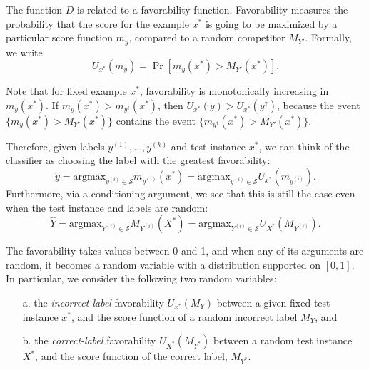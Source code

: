 \documentclass[twoside,11pt]{article}
\newcommand{\argmax}{\text{argmax}}
\begin{document}
The function ${D}$ is related to a favorability
function. Favorability measures the probability that the score for the
example $x^*$ is going to be maximized by a particular score function $m_y$,
compared to a random competitor $M_{Y'}$.  Formally, we write
\begin{equation}\label{eq:U_function}
U_{x^*}(m_{y}) = \Pr[m_{y}(x^*) > M_{Y'}(x^*)].
\end{equation}

Note that for fixed example $x^*$, favorability is monotonically
increasing in $m_{y}(x^*)$.  If $m_y(x^*) > m_{y^\dagger}(x^*)$, then
$U_{x^*}(y) > U_{x^*}(y^\dagger)$, because the event $\{m_{y}(x^*) >
M_{Y'}(x^*)\}$ contains the event $\{m_{y^\dagger}(x^*) >
M_{Y'}(x^*)\}$.

Therefore, given labels $y^{(1)},\hdots,y^{(k)}$ and test instance
$x^*$, we can think of the classifier as choosing the label with the
greatest favorability:
\[
\hat{y} = \argmax_{y^{(i)} \in \mathcal{S}} m_{y^{(i)}}(x^*) = \argmax_{y^{(i)} \in \mathcal{S}} U_{x^*}(m_{y^{(i)}}).
\]
Furthermore, via a conditioning argument, we see that this is still
the case even when the test instance and labels are random:
\[
\hat{Y} = \argmax_{Y^{(i)} \in \mathcal{S}} M_{Y^{(i)}}(X^*) = \argmax_{Y^{(i)} \in \mathcal{S}} U_{X^*}(M_{Y^{(i)}}).
\]

The favorability takes values between 0 and 1, and when any of its
arguments are random, it becomes a random variable with a distribution
supported on $[0,1]$.  In particular, we consider the following two
random variables:
\begin{itemize}
\item[a.] the \emph{incorrect-label} favorability $U_{x^*}(M_Y)$
  between a given fixed test instance $x^*$, and the score function of
  a random incorrect label $M_{Y}$, and
\item[b.] the \emph{correct-label} favorability $U_{X^*}(M_{Y^*})$
  between a random test instance $X^*$, and the score function of the
  correct label, $M_{Y^*}$.
\end{itemize}
\end{document}
